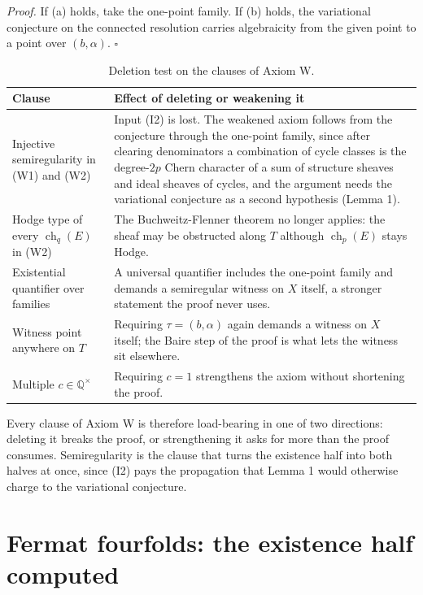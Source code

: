 \documentclass[10pt,twocolumn]{article}
\begin{document}
\emph{Proof.} If (a) holds, take the one-point family. If (b) holds, the
variational conjecture on the connected resolution carries algebraicity
from the given point to a point over \((b,\alpha)\). \(\square\)

\begin{table}[t]
\centering\footnotesize
\caption{Deletion test on the clauses of Axiom W.}
\begin{tabular}{@{}p{}p{}@{}}
\toprule
Clause & Effect of deleting or weakening it \\
\midrule
Injective semiregularity in (W1) and (W2) & Input (I2) is lost. The weakened axiom follows from the conjecture through the one-point family, since after clearing denominators a combination of cycle classes is the degree-$2p$ Chern character of a sum of structure sheaves and ideal sheaves of cycles, and the argument needs the variational conjecture as a second hypothesis (Lemma 1). \\
Hodge type of every $\operatorname{ch}_q(E)$ in (W2) & The Buchweitz-Flenner theorem no longer applies: the sheaf may be obstructed along $T$ although $\operatorname{ch}_p(E)$ stays Hodge. \\
Existential quantifier over families & A universal quantifier includes the one-point family and demands a semiregular witness on $X$ itself, a stronger statement the proof never uses. \\
Witness point anywhere on $T$ & Requiring $\tau=(b,\alpha)$ again demands a witness on $X$ itself; the Baire step of the proof is what lets the witness sit elsewhere. \\
Multiple $c\in\mathbb{Q}^\times$ & Requiring $c=1$ strengthens the axiom without shortening the proof. \\
\bottomrule
\end{tabular}
\end{table}

Every clause of Axiom W is therefore load-bearing in one of two
directions: deleting it breaks the proof, or strengthening it asks for
more than the proof consumes. Semiregularity is the clause that turns
the existence half into both halves at once, since (I2) pays the
propagation that Lemma 1 would otherwise charge to the variational
conjecture.

\hypertarget{fermat-fourfolds-the-existence-half-computed}{%
\section{Fermat fourfolds: the existence half
computed}\label{fermat-fourfolds-the-existence-half-computed}}
\end{document}
